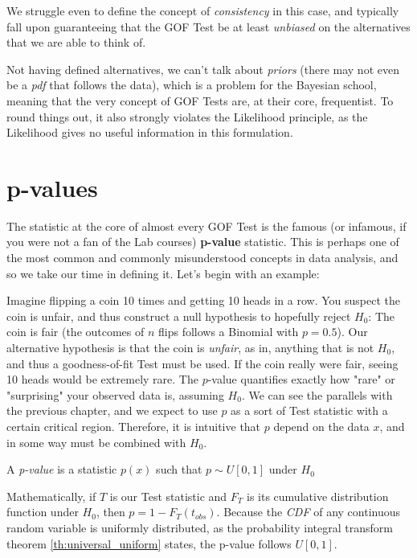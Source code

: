 We struggle even to define the concept of \emph{consistency} in this case, and typically fall upon guaranteeing that the GOF Test be at least \emph{unbiased} on the alternatives that we are able to think of.

Not having defined alternatives, we can't talk about \emph{priors} (there may not even be a \emph{pdf} that follows the data), which is a problem for the Bayesian school, meaning that the very concept of GOF Tests are, at their core, frequentist. To round things out, it also strongly violates the Likelihood principle, as the Likelihood gives no useful information in this formulation.

\section{p-values}

The statistic at the core of almost every GOF Test is the famous (or infamous, if you were not a fan of the Lab courses) \textbf{p-value} statistic. This is perhaps one of the most common and commonly misunderstood concepts in data analysis, and so we take our time in defining it. Let's begin with an example:

Imagine flipping a coin 10 times and getting 10 heads in a row. You suspect the coin is unfair, and thus construct a null hypothesis to hopefully reject $H_0$: The coin is fair (the outcomes of $n$ flips follows a Binomial with $p=0.5$). Our alternative hypothesis is that the coin is \emph{unfair}, as in, anything that is not $H_0$, and thus a goodness-of-fit Test must be used. If the coin really were fair, seeing 10 heads would be extremely rare. The $p$-value quantifies exactly how "rare" or "surprising" your observed data is, assuming $H_0$. We can see the parallels with the previous chapter, and we expect to use $p$ as a sort of Test statistic with a certain critical region. Therefore, it is intuitive that $p$ depend on the data $x$, and in some way must be combined with $H_0$. 

\begin{definition}[p-value]
	A \emph{p-value} is a statistic $p(x)$ such that $p\sim U[0,1]$ under $H_0$
\end{definition}

Mathematically, if $T$ is our Test statistic and $F_T$ is its cumulative distribution function under $H_0$, then $p = 1 - F_T(t_{obs})$. Because the \emph{CDF} of any continuous random variable is uniformly distributed, as the probability integral transform theorem \ref{th:universal_uniform} states, the p-value follows $U[0, 1]$.

